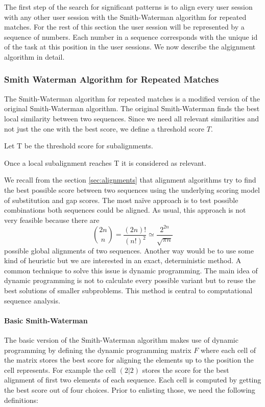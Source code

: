 The first step of the search for significant patterns is to align every user session with any other user session with the Smith-Waterman algorithm for repeated matches.
For the rest of this section the user session will be represented by a sequence of numbers. Each number in a sequence corresponds with the unique id of the task at this position in the user sessions.
We now describe the algignment algorithm in detail.

\subsubsection{Smith Waterman Algorithm for Repeated Matches}
The Smith-Waterman algorithm for repeated matches\cite{durbin1998} is a modified version of the original Smith-Waterman algorithm\cite{waterman1981}.
The original Smith-Waterman finds the best local similarity between two sequences.
Since we need all relevant similarities and not just the one with the best score, we define a threshold score $T$.
\begin{definition}
	Let T be the threshold score for subalignments.
	\label{def:treshold}
\end{definition}
Once a local subalignment reaches T it is considered as relevant.

We recall from the section \ref{sec:alignments} that alignment algorithms try to find the best possible score between two sequences using the underlying scoring model of substitution and gap scores.
The most na\"ive approach is to test possible combinations both sequences could be aligned. As usual, this approach is not very feasible because there are
\begin{equation*}
	\binom{2n}{n} = \frac{(2n)!}{(n!)^2} \simeq \frac{2^{2n}}{\sqrt{\pi n}}
\end{equation*}
possible global alignments of two sequences\cite{durbin1998}.
Another way would be to use some kind of heuristic but we are interested in an exact, deterministic method.
A common technique to solve this issue is dynamic programming\cite{bellman1957}.
The main idea of dynamic programming is not to calculate every possible variant but to reuse the best solutions of smaller subproblems.
This method is central to computational sequence analysis\cite{durbin1998}.

\paragraph{Basic Smith-Waterman}
The basic version of the Smith-Waterman algorithm makes use of dynamic programming by defining the dynamic programming matrix $F$ where each cell of the matrix stores the best score for aligning the elements up to the position the cell represents.
For example the cell $(2|2)$ stores the score for the best alignment of first two elements of each sequence.
Each cell is computed by getting the best score out of four choices. Prior to enlisting those, we need the following definitions:

